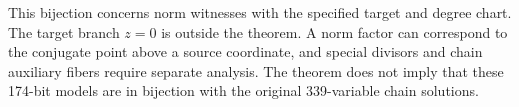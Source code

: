 This bijection concerns norm witnesses with the specified target and degree
chart. The target branch $z=0$ is outside the theorem. A norm factor can
correspond to the conjugate point above a source coordinate, and special
divisors and chain auxiliary fibers require separate analysis. The theorem
does not imply that these 174-bit models are in bijection with the original
339-variable chain solutions.

